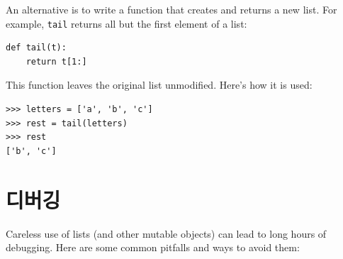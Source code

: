 \documentclass[10pt]{book}
\begin{document}
An alternative is to write a function that creates and
returns a new list.  For
example, {\tt tail} returns all but the first
element of a list:

\begin{verbatim}
def tail(t):
    return t[1:]
\end{verbatim}
%
This function leaves the original list unmodified.
Here's how it is used:

\begin{verbatim}
>>> letters = ['a', 'b', 'c']
>>> rest = tail(letters)
>>> rest
['b', 'c']
\end{verbatim}



\section{디버깅}

Careless use of lists (and other mutable objects)
can lead to long hours of debugging.  Here are some common
pitfalls and ways to avoid them:
\end{document}
